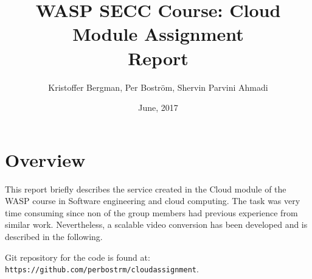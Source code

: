 \documentclass[a4paper, 10pt, english]{article}
\title{WASP SECC Course: Cloud Module Assignment\\Report}
\author{Kristoffer Bergman, Per Boström, Shervin Parvini Ahmadi}
\date{June, 2017}
\begin{document}
\maketitle

\section{Overview}
This report briefly describes the service created in the Cloud module of the WASP course in Software engineering and cloud computing. 
The task was very time consuming since non of the group members had previous experience from similar work. Nevertheless, a scalable video conversion has been developed and is described in the following.

Git repository for the code is found at: \verb|https://github.com/perbostrm/cloudassignment|.
\end{document}
